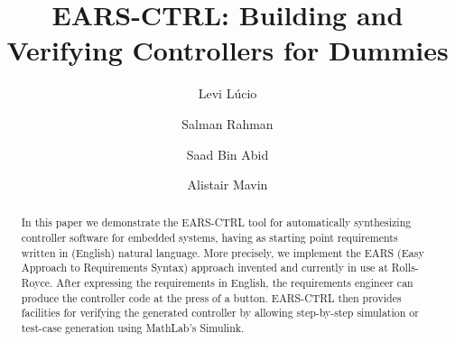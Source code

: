 \documentclass{llncs}
\begin{document}
%
\frontmatter          %

\mainmatter              %
%
\title{EARS-CTRL: Building and Verifying Controllers for Dummies}
%
\titlerunning{}  %
%
\author{Levi L\'ucio \and Salman Rahman
 \and Saad Bin Abid \and Alistair Mavin}
%
\authorrunning{} %
%
\tocauthor{}
%

\maketitle              %

\begin{abstract}
In this paper we demonstrate the EARS-CTRL tool for automatically
synthesizing controller software for embedded systems, having as starting point
requirements written in (English) natural language. More precisely, we implement
the EARS (Easy Approach to Requirements Syntax) approach invented and currently
in use at Rolls-Royce. After expressing the requirements in English, the
requirements engineer can produce the controller code at the press of a button.
EARS-CTRL then provides facilities for verifying the generated
controller by allowing step-by-step simulation or test-case generation using
MathLab's Simulink.
\end{abstract}

 











%
% 


\end{document}
